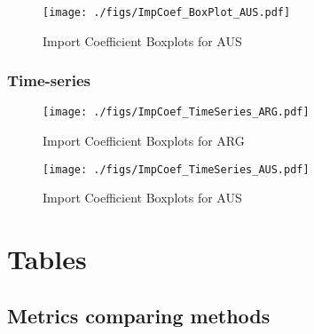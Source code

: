 \documentclass[11pt]{article}
\begin{document}
\begin{figure}[t]
\centering
\texttt{[image: ./figs/ImpCoef\_BoxPlot\_AUS.pdf]}
\caption{Import Coefficient Boxplots for AUS}
\end{figure}
\subsubsection{Time-series}
\label{sec:orge382f51}


\begin{figure}[t]
\centering
\texttt{[image: ./figs/ImpCoef\_TimeSeries\_ARG.pdf]}
\caption{Import Coefficient Boxplots for ARG}
\end{figure}

\begin{figure}[t]
\centering
\texttt{[image: ./figs/ImpCoef\_TimeSeries\_AUS.pdf]}
\caption{Import Coefficient Boxplots for AUS}
\end{figure}
\section{Tables}
\label{sec:orgb2bf587}

\subsection{Metrics comparing methods}
\label{sec:org3092e1c}
\end{document}
